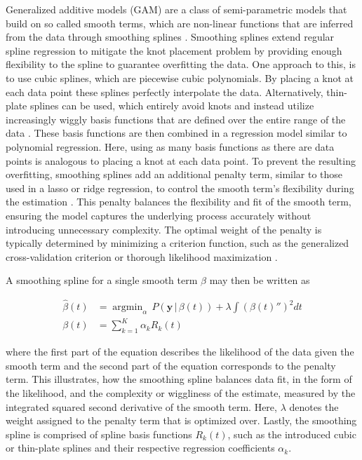\documentclass[man, floatsintext]{apa7}
\DeclareMathOperator*{\argmin}{argmin}
\begin{document}
Generalized additive models (GAM) are a class of semi-parametric models that
build on so called smooth terms, which are non-linear functions that are
inferred from the data through smoothing splines
\parencite{wood_generalized_2006, wood_inference_2020,
  hastie_generalized_1999}. Smoothing splines extend regular spline regression
to mitigate the knot placement problem by providing enough flexibility to the
spline to guarantee overfitting the data. One approach to this, is to use cubic
splines, which are piecewise cubic polynomials. By placing a knot at each data
point these splines perfectly interpolate the data. Alternatively, thin-plate
splines can be used, which entirely avoid knots and instead utilize
increasingly wiggly basis functions that are defined over the entire range of
the data \parencite{wood_thin_2003}. These basis functions are then combined in
a regression model similar to polynomial regression. Here, using as many basis
functions as there are data points is analogous to placing a knot at each data
point. To prevent the resulting overfitting, smoothing splines add an
additional penalty term, similar to those used in a lasso or ridge regression,
to control the smooth term's flexibility during the estimation
\parencite{gu_smoothing_2013, wahba_spline_1980}. This penalty balances the
flexibility and fit of the smooth term, ensuring the model captures the
underlying process accurately without introducing unnecessary complexity. The
optimal weight of the penalty is typically determined by minimizing a criterion
function, such as the generalized cross-validation criterion or thorough
likelihood maximization \parencite{wood_generalized_2006,
  golub_generalized_1997}.

A smoothing spline for a single smooth term $\beta$ may then be written as

\begin{equation}
  \begin{aligned}
    \hat{\beta}(t) & = \argmin_\alpha \, P(\textbf{y} \, | \, \beta(t)) +
    \lambda \int {(\beta(t)'')}^2 dt                                      \\
    \beta(t)       & = \sum^K_{k = 1} \alpha_k R_k(t)
  \end{aligned}
\end{equation}

\noindent where the first part of the equation describes the likelihood
of the data given the smooth term and the second part of the equation
corresponds to the penalty term. This illustrates, how the smoothing
spline balances data fit, in the form of the likelihood, and the complexity or
wiggliness of the estimate, measured by the integrated squared second
derivative of the smooth term. Here, $\lambda$ denotes the weight assigned to
the penalty term that is optimized over. Lastly, the smoothing spline is
comprised of spline basis functions $R_k(t)$, such as the introduced cubic or
thin-plate splines and their respective regression coefficients $\alpha_k$.
\end{document}
